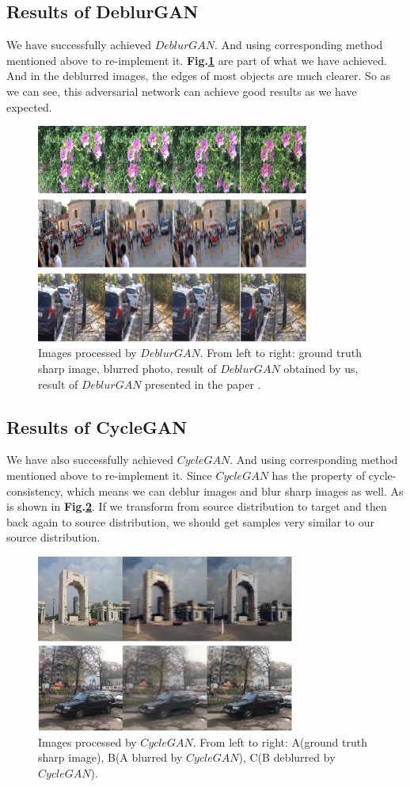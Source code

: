 \documentclass[journal]{IEEEtran}
\begin{document}
\subsection{Results of DeblurGAN}
We have successfully achieved $DeblurGAN$. And using corresponding method mentioned above to re-implement it.
\textbf{Fig.\ref{fig:result}}  are part of what we have achieved. And in the deblurred images, the edges of most objects are much clearer.  So as we can see, this adversarial network can achieve good results as we have expected.
\begin{figure}
	\centering
	\includegraphics[width=0.8\textwidth]{fig/result.png}
	\caption{ Images processed by $DeblurGAN$. From left to right: ground truth sharp image, blurred photo, result of $DeblurGAN$ obtained by us, result of $DeblurGAN$ presented in the paper \cite{deblurgan}. }
	\label{fig:result}
\end{figure}
\subsection{Results of CycleGAN}
We have also successfully achieved $CycleGAN$. And using corresponding method mentioned above to re-implement it. Since $CycleGAN$ has the property of cycle-consistency, which means we can deblur images and blur sharp images as well. As is shown in \textbf{Fig.\ref{fig:cycle}}. If we transform from source distribution to target and then back again to source distribution, we should get samples very similar to our source distribution. 
\begin{figure}[htbp]
	\centering
	\includegraphics[width=8.5cm]{fig/cycle.png}
	\caption{ Images processed by $CycleGAN$. From left to right: A(ground truth sharp image), B(A blurred by $CycleGAN$), C(B deblurred by $CycleGAN$).}
	\label{fig:cycle}
\end{figure}
\end{document}
